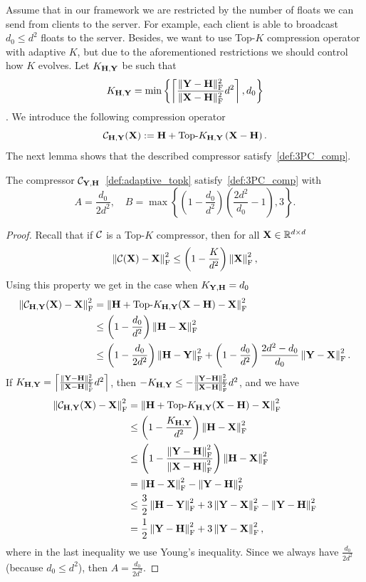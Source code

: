 \documentclass[11pt]{article}
\begin{document}
	
	Assume that in our framework we are restricted by the number of floats we can send from clients to the server. For example, each client is able to broadcast $d_0 \leq d^2$ floats to the server. Besides, we want to use Top-$K$ compression operator with adaptive $K$, but due to the aforementioned restrictions we should control how $K$ evolves. Let $K_{\mathbf{H},\mathbf{Y}}$ be such that
	$$K_{\mathbf{H},\mathbf{Y}} = \min\left\{\left\lceil \frac{\|\mathbf{Y}-\mathbf{H}\|^2_{\rm F}}{\|\mathbf{X}-\mathbf{H}\|^2_{\rm F}}d^2\right\rceil, d_0\right\}$$. We introduce the following compression operator 
	\begin{equation}\label{def:adaptive_topk}
		{\mathcal{C}}_{\mathbf{H},\mathbf{Y}}(\mathbf{X}) \; { := }\; \mathbf{H} + \text{Top-}K_{\mathbf{H},\mathbf{Y}}\left(\mathbf{X}-\mathbf{H}\right).
	\end{equation}
	The next lemma shows that the described compressor satisfy~\eqref{def:3PC_comp}.
	\begin{lemma}
		The compressor ${\mathcal{C}}_{\mathbf{Y},\mathbf{H}}$~\eqref{def:adaptive_topk} satisfy~\eqref{def:3PC_comp} with $$A=\frac{d_0}{2d^2}, \quad B = \max\left\{\left(1-\frac{d_0}{d^2}\right)\left(\frac{2d^2}{d_0}-1\right), 3\right\}.$$
	\end{lemma}
	\begin{proof}
		Recall that if ${\mathcal{C}}$ is a Top-$K$ compressor, then for all $\mathbf{X}\in \mathbb{R}^{d\times d}$ 
		$$\left\|{\mathcal{C}}(\mathbf{X})-\mathbf{X}\right\|^2_{\rm F} \leq \left(1-\frac{K}{d^2}\right)\left\|\mathbf{X}\right\|^2_{\rm F},$$
		Using this property we get in the case when $K_{\mathbf{Y},\mathbf{H}} = d_0$
		\begin{align*}
			\left\|{\mathcal{C}}_{\mathbf{H},\mathbf{Y}}(\mathbf{X}) - \mathbf{X}\right\|^2_{\rm F} &= \left\|\mathbf{H} + \text{Top-}K_{\mathbf{H},\mathbf{Y}}(\mathbf{X}-\mathbf{H}) - \mathbf{X}\right\|_{\rm F}^2\\
			&\leq \left(1-\frac{d_0}{d^2}\right)\left\|\mathbf{H}-\mathbf{X}\right\|^2_{\rm F}\\
			&\leq \left(1-\frac{d_0}{2d^2}\right)\left\|\mathbf{H}-\mathbf{Y}\right\|^2_{\rm F} + \left(1-\frac{d_0}{d^2}\right)\frac{2d^2-d_0}{d_0}\left\|\mathbf{Y}-\mathbf{X}\right\|^2_{\rm F}.
		\end{align*}
		If $K_{\mathbf{H},\mathbf{Y}} = \left\lceil \frac{\|\mathbf{Y}-\mathbf{H}\|^2_{\rm F}}{\|\mathbf{X}-\mathbf{H}\|^2_{\rm F}}d^2\right\rceil$, then $-K_{\mathbf{H},\mathbf{Y}}  \leq -\frac{\|\mathbf{Y}-\mathbf{H}\|^2_{\rm F}}{\|\mathbf{X}-\mathbf{H}\|^2_{\rm F}}d^2$, and we have 
		\begin{align*}
			\left\|{\mathcal{C}}_{\mathbf{H},\mathbf{Y}}(\mathbf{X}) - \mathbf{X}\right\|^2_{\rm F} &= \left\|\mathbf{H}+\text{Top-}K_{\mathbf{H},\mathbf{Y}}(\mathbf{X}-\mathbf{H})-\mathbf{X}\right\|^2_{\rm F}\\
			&\leq \left(1-\frac{K_{\mathbf{H},\mathbf{Y}}}{d^2}\right)\left\|\mathbf{H}-\mathbf{X}\right\|^2_{\rm F}\\
			&\leq \left(1-\frac{\left\|\mathbf{Y}-\mathbf{H}\right\|^2_{\rm F}}{\left\|\mathbf{X}-\mathbf{H}\right\|^2_{\rm F}}\right)\left\|\mathbf{H}-\mathbf{X}\right\|^2_{\rm F}\\
			&= \left\|\mathbf{H}-\mathbf{X}\right\|^2_{\rm F} - \left\|\mathbf{Y}-\mathbf{H}\right\|^2_{\rm F}\\
			&\leq \frac{3}{2}\left\|\mathbf{H}-\mathbf{Y}\right\|^2_{\rm F} + 3\left\|\mathbf{Y}-\mathbf{X}\right\|^2_{\rm F}- \left\|\mathbf{Y}-\mathbf{H}\right\|^2_{\rm F}\\
			&=\frac{1}{2}\left\|\mathbf{Y}-\mathbf{H}\right\|^2_{\rm F} + 3\left\|\mathbf{Y}-\mathbf{X}\right\|^2_{\rm F},
		\end{align*}
		where in the last inequality we use Young's inequality. Since we always have $\frac{d_0}{2d^2}$ (because $d_0 \leq d^2$), then $A = \frac{d_0}{2d^2}.$
	\end{proof}
	
\end{document}
